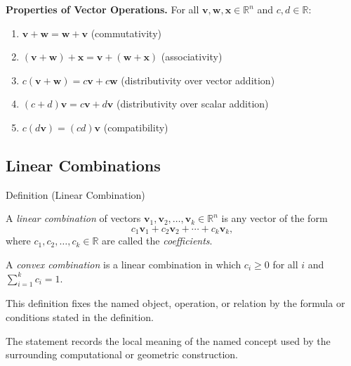\begin{remark*}[Exposition]
\textbf{Properties of Vector Operations.}
For all $\mathbf{v}, \mathbf{w}, \mathbf{x} \in \mathbb{R}^n$ and $c, d \in \mathbb{R}$:
\begin{enumerate}
  \item $\mathbf{v} + \mathbf{w} = \mathbf{w} + \mathbf{v}$ \hfill (commutativity)
  \item $(\mathbf{v} + \mathbf{w}) + \mathbf{x} = \mathbf{v} + (\mathbf{w} + \mathbf{x})$ \hfill (associativity)
  \item $c(\mathbf{v} + \mathbf{w}) = c\mathbf{v} + c\mathbf{w}$ \hfill (distributivity over vector addition)
  \item $(c + d)\mathbf{v} = c\mathbf{v} + d\mathbf{v}$ \hfill (distributivity over scalar addition)
  \item $c(d\mathbf{v}) = (cd)\mathbf{v}$ \hfill (compatibility)
\end{enumerate}
\end{remark*}

\subsection*{Linear Combinations}

\begin{definitionbox}{Definition (Linear Combination)}
\begin{definition}
\label{def:linear-combination}
A \emph{linear combination} of vectors $\mathbf{v}_1, \mathbf{v}_2, \ldots, \mathbf{v}_k \in \mathbb{R}^n$
is any vector of the form
\[
  c_1\mathbf{v}_1 + c_2\mathbf{v}_2 + \cdots + c_k\mathbf{v}_k,
\]
where $c_1, c_2, \ldots, c_k \in \mathbb{R}$ are called the \emph{coefficients}.

A \emph{convex combination} is a linear combination in which $c_i \geq 0$
for all $i$ and $\sum_{i=1}^k c_i = 1$.
\end{definition}
\end{definitionbox}
\begin{remark*}
This definition fixes the named object, operation, or relation by the formula
or conditions stated in the definition.
\end{remark*}

\begin{remark*}[Interpretation]
The statement records the local meaning of the named concept used by the
surrounding computational or geometric construction.
\end{remark*}

